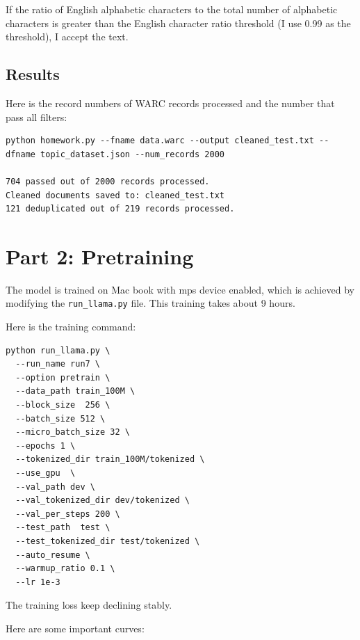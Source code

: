 \documentclass[11pt,a4paper]{article}
\begin{document}
If the ratio of English alphabetic characters to the total number of alphabetic characters is greater than the English character ratio threshold (I use 0.99 as the threshold), I accept the text.

\subsection{Results}

Here is the record numbers of WARC records processed and the number that pass all filters:


\begin{lstlisting}
python homework.py --fname data.warc --output cleaned_test.txt --dfname topic_dataset.json --num_records 2000

704 passed out of 2000 records processed.
Cleaned documents saved to: cleaned_test.txt
121 deduplicated out of 219 records processed.
\end{lstlisting}

\section{Part 2: Pretraining}

The model is trained on Mac book with mps device enabled, which is achieved by modifying the \texttt{run\_llama.py} file. This training takes about 9 hours.

Here is the training command:
\begin{lstlisting}
python run_llama.py \
  --run_name run7 \
  --option pretrain \
  --data_path train_100M \
  --block_size  256 \
  --batch_size 512 \
  --micro_batch_size 32 \
  --epochs 1 \
  --tokenized_dir train_100M/tokenized \
  --use_gpu  \
  --val_path dev \
  --val_tokenized_dir dev/tokenized \
  --val_per_steps 200 \
  --test_path  test \
  --test_tokenized_dir test/tokenized \
  --auto_resume \
  --warmup_ratio 0.1 \
  --lr 1e-3 
\end{lstlisting}

The training loss keep declining stably.

Here are some important curves:
\end{document}
